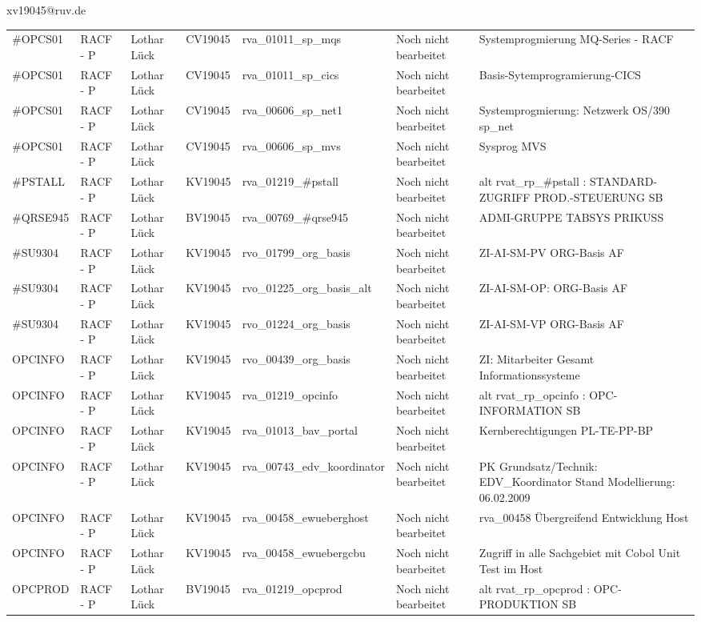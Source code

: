 \documentclass[a4paper,landscape,12pt]{letter}
\begin{document}
\begin{letter}{xv19045@ruv.de\hfill \break}
\begin{tiny}
\begin{longtable}{|p{35mm}|p{15mm}|p{25mm}|p{10mm}|p{40mm}|p{50mm}|p{50mm}|}
\#OPCS01 & RACF - P & Lothar Lück & CV19045 & rva\_01011\_sp\_mqs & Noch nicht bearbeitet & Systemprogmierung MQ-Series - RACF \\
\#OPCS01 & RACF - P & Lothar Lück & CV19045 & rva\_01011\_sp\_cics & Noch nicht bearbeitet & Basis-Sytemprogramierung-CICS \\
\#OPCS01 & RACF - P & Lothar Lück & CV19045 & rva\_00606\_sp\_net1 & Noch nicht bearbeitet & Systemprogmierung: Netzwerk OS/390 sp\_net \\
\#OPCS01 & RACF - P & Lothar Lück & CV19045 & rva\_00606\_sp\_mvs & Noch nicht bearbeitet & Sysprog MVS \\
\#PSTALL & RACF - P & Lothar Lück & KV19045 & rva\_01219\_\#pstall & Noch nicht bearbeitet & alt rvat\_rp\_\#pstall          : STANDARD-ZUGRIFF PROD.-STEUERUNG SB \\
\#QRSE945 & RACF - P & Lothar Lück & BV19045 & rva\_00769\_\#qrse945 & Noch nicht bearbeitet & ADMI-GRUPPE TABSYS PRIKUSS \\
\#SU9304 & RACF - P & Lothar Lück & KV19045 & rvo\_01799\_org\_basis & Noch nicht bearbeitet & ZI-AI-SM-PV ORG-Basis AF \\
\#SU9304 & RACF - P & Lothar Lück & KV19045 & rvo\_01225\_org\_basis\_alt & Noch nicht bearbeitet & ZI-AI-SM-OP: ORG-Basis AF \\
\#SU9304 & RACF - P & Lothar Lück & KV19045 & rvo\_01224\_org\_basis & Noch nicht bearbeitet & ZI-AI-SM-VP ORG-Basis AF \\
OPCINFO & RACF - P & Lothar Lück & KV19045 & rvo\_00439\_org\_basis & Noch nicht bearbeitet & ZI: Mitarbeiter Gesamt Informationssysteme \\
OPCINFO & RACF - P & Lothar Lück & KV19045 & rva\_01219\_opcinfo & Noch nicht bearbeitet & alt rvat\_rp\_opcinfo          : OPC- INFORMATION                         SB \\
OPCINFO & RACF - P & Lothar Lück & KV19045 & rva\_01013\_bav\_portal & Noch nicht bearbeitet & Kernberechtigungen PL-TE-PP-BP \\
OPCINFO & RACF - P & Lothar Lück & KV19045 & rva\_00743\_edv\_koordinator & Noch nicht bearbeitet & PK Grundsatz/Technik: EDV\_Koordinator Stand Modellierung: 06.02.2009 \\
OPCINFO & RACF - P & Lothar Lück & KV19045 & rva\_00458\_ewueberghost & Noch nicht bearbeitet & rva\_00458 Übergreifend Entwicklung Host \\
OPCINFO & RACF - P & Lothar Lück & KV19045 & rva\_00458\_ewuebergcbu & Noch nicht bearbeitet & Zugriff in alle Sachgebiet mit Cobol Unit Test im Host \\
OPCPROD & RACF - P & Lothar Lück & BV19045 & rva\_01219\_opcprod & Noch nicht bearbeitet & alt rvat\_rp\_opcprod          : OPC-PRODUKTION                           SB \\


\end{longtable}
\end{tiny}
\end{letter}
\end{document}

